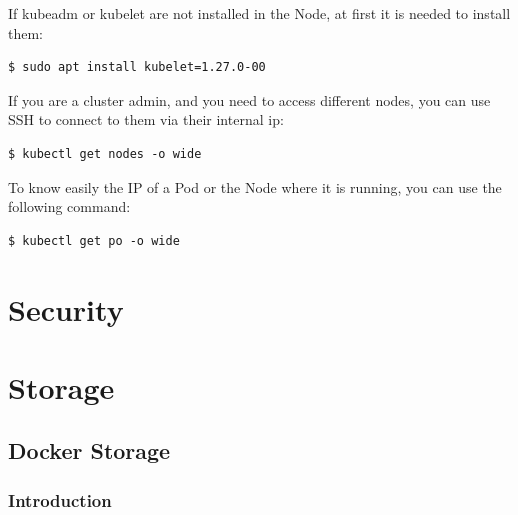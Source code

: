 \documentclass{article}
\newenvironment{blocktemplateI}[1]{%
    \tcolorbox[beamer,%
    noparskip,breakable,
    colframe=Violet,%
    colbacklower=Black,%
    title=#1]}%
    {\endtcolorbox}
\newenvironment{blocktemplateII}[1]{%
    \tcolorbox[beamer,%
    noparskip,breakable,
    colframe=Green,%
    colbacklower=LimeGreen!75!LightGreen,%
    title=#1]}%
    {\endtcolorbox}
\newenvironment{blocktemplateIII}[1]{%
    \tcolorbox[beamer,%
    noparskip,breakable,
    ,colframe=Red,%
    colbacklower=LimeGreen!75!LightGreen,%
    title=#1]}%
    {\endtcolorbox}
\newenvironment{codetemplate}[1][]{%
  \mybasecolorbox[#1]
  \itshape
}{%
  \endmybasecolorbox
}
\begin{document}
\begin{blocktemplateIII}{WARNING}
If kubeadm or kubelet are not installed in the Node, at first it is needed to install them:
\begin{codetemplate}{}
\begin{verbatim}
$ sudo apt install kubelet=1.27.0-00
\end{verbatim}
\end{codetemplate}
\end{blocktemplateIII}

\begin{blocktemplateII}{NOTE}
If you are a cluster admin, and you need to access different nodes, you can use SSH to connect to them via their internal ip:
\begin{codetemplate}{}
\begin{verbatim}
$ kubectl get nodes -o wide
\end{verbatim}
\end{codetemplate}
\end{blocktemplateII}

\begin{blocktemplateI}{NOTE}
To know easily the IP of a Pod or the Node where it is running, you can use the following command:
\begin{codetemplate}{}
\begin{verbatim}
$ kubectl get po -o wide
\end{verbatim}
\end{codetemplate}
\end{blocktemplateI}

\newpage
\section{Security}

\newpage
\section{Storage}

\subsection{Docker Storage}

\subsubsection{Introduction}
\end{document}
